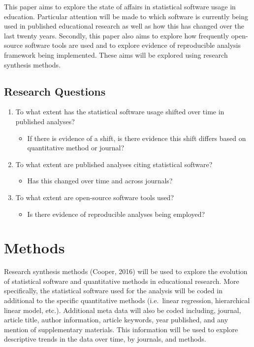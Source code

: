\documentclass[english,floatsintext,man]{apa6}
\providecommand{\tightlist}{%
  \setlength{\itemsep}{0pt}\setlength{\parskip}{0pt}}
\newcounter{author}
\theoremstyle{definition}
\theoremstyle{definition}
\theoremstyle{remark}
\begin{document}
This paper aims to explore the state of affairs in statistical software
usage in education. Particular attention will be made to which software
is currently being used in published educational research as well as how
this has changed over the last twenty years. Secondly, this paper also
aims to explore how frequently open-source software tools are used and
to explore evidence of reproducible analysis framework being
implemented. These aims will be explored using research synthesis
methods.

\subsection{Research Questions}\label{research-questions}

\begin{enumerate}
\def\labelenumi{\arabic{enumi}.}
\tightlist
\item
  To what extent has the statistical software usage shifted over time in
  published analyses?

  \begin{itemize}
  \tightlist
  \item
    If there is evidence of a shift, is there evidence this shift
    differs based on quantitative method or journal?
  \end{itemize}
\item
  To what extent are published analyses citing statistical software?

  \begin{itemize}
  \tightlist
  \item
    Has this changed over time and across journals?
  \end{itemize}
\item
  To what extent are open-source software tools used?

  \begin{itemize}
  \tightlist
  \item
    Is there evidence of reproducible analyses being employed?
  \end{itemize}
\end{enumerate}

\section{Methods}\label{methods}

Research synthesis methods (Cooper, 2016) will be used to explore the
evolution of statistical software and quantitative methods in
educational research. More specifically, the statistical software used
for the analysis will be coded in additional to the specific
quantitative methods (i.e.~linear regression, hierarchical linear model,
etc.). Additional meta data will also be coded including, journal,
article title, author information, article keywords, year published, and
any mention of supplementary materials. This information will be used to
explore descriptive trends in the data over time, by journals, and
methods.
\end{document}
